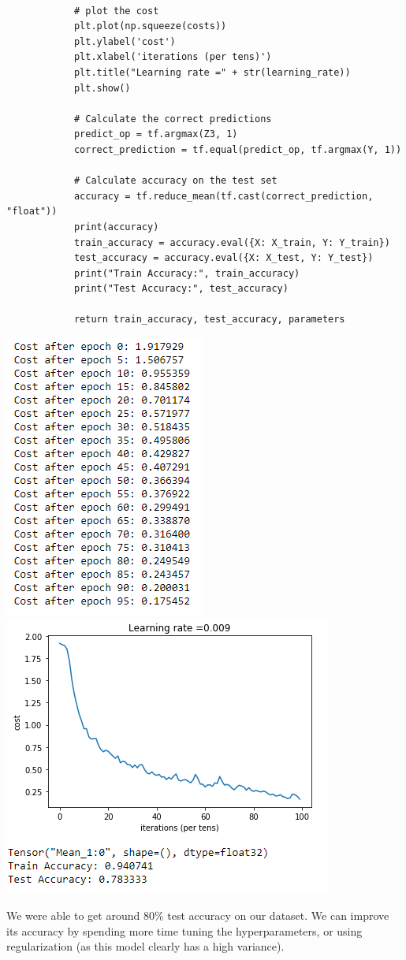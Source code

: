 \documentclass[11pt, a4paper]{article}
\begin{document}
\begin{spacing}{1.1}
	\begin{lstlisting}
				
			# plot the cost
			plt.plot(np.squeeze(costs))
			plt.ylabel('cost')
			plt.xlabel('iterations (per tens)')
			plt.title("Learning rate =" + str(learning_rate))
			plt.show()
			
			# Calculate the correct predictions
			predict_op = tf.argmax(Z3, 1)
			correct_prediction = tf.equal(predict_op, tf.argmax(Y, 1))
			
			# Calculate accuracy on the test set
			accuracy = tf.reduce_mean(tf.cast(correct_prediction, "float"))
			print(accuracy)
			train_accuracy = accuracy.eval({X: X_train, Y: Y_train})
			test_accuracy = accuracy.eval({X: X_test, Y: Y_test})
			print("Train Accuracy:", train_accuracy)
			print("Test Accuracy:", test_accuracy)
			
			return train_accuracy, test_accuracy, parameters \end{lstlisting}
	\begin{center} \includegraphics[scale=.9]{conv_net_2} \hspace*{10mm}	\includegraphics[scale=.9]{conv_net}	\end{center}
	We were able to get around 80\% test accuracy on our dataset. We can improve its accuracy by spending more time tuning the hyperparameters, or using regularization (as this model clearly has a high variance). \newpage


\end{spacing}
\end{document}
